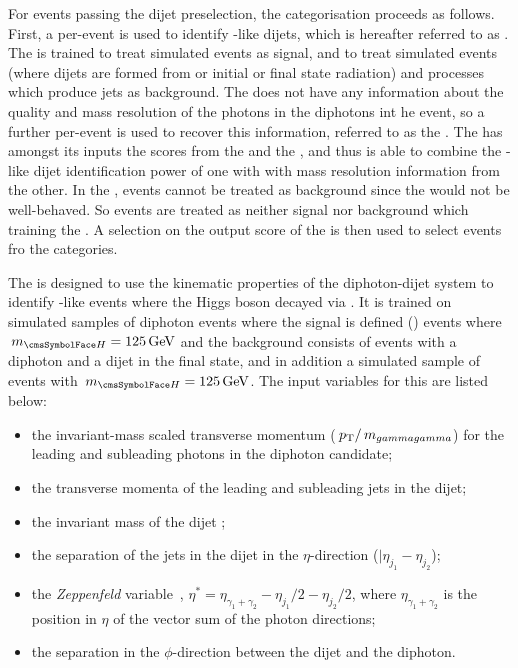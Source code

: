 For events passing the dijet preselection, the \VBFTag categorisation proceeds as follows. First, a per-event \BDT is used to identify \VBF-like dijets, which is hereafter referred to as \DiJetBdt. The \DiJetBdt is trained to treat simulated \VBF events as signal, and to treat simulated \ggH events (where dijets are formed from \PU or initial or final state radiation) and \SM processes which produce jets as background. The \DiJetBdt does not have any information about the quality and mass resolution of the photons in the diphotons int he event, so a further per-event \BDT is used to recover this information, referred to as the \DiPhoDiJetBdt. The \DiPhoDiJetBdt has amongst its inputs the scores from the \DiPhoBdt and the \DiJetBdt, and thus is able to combine the \VBF-like dijet identification power of one \BDT with with mass resolution information from the other. In the  \DiPhoDiJetBdt, \ggH events cannot be treated as background since the \DiPhoBdt would not be well-behaved. So \ggH events are treated as neither signal nor background which training the \DiPhoDiJetBdt. A selection on the output score of the \DiPhoDiJetBdt is then used to select events fro the \VBFTag categories.

The \DiJetBdt is designed to use the kinematic properties of the diphoton-dijet system to identify \VBF-like events where the Higgs boson decayed via \Hgg. It is trained on simulated samples of diphoton events where the signal is defined \VBF (\Hgg) events where $\mH=125\GeV$ and the background consists of \SM events with a diphoton and a dijet in the final state, and in addition a simulated sample of \ggH events with $\mH=125\GeV$. The input variables for this \BDT are listed below:
\begin{itemize}
\item the invariant-mass scaled transverse momentum ($\,p_\text{T}/\,m_{gammagamma}$) for the leading and subleading photons in the diphoton candidate;
\item the transverse momenta of the leading and subleading jets in the dijet;
\item the invariant mass of the dijet \mjj;
\item the separation of the jets in the dijet in the $\eta$-direction ($|\eta_{j_1} - \eta_{j_2}$);
\item the \emph{Zeppenfeld} variable~\cite{Zeppenfeld}, $\eta^{*} = \eta_{\gamma_1+\gamma_2} - \eta_{j_1}/2 - \eta_{j_2}/2$, where $\eta_{\gamma_1+\gamma_2}$ is the position in $\eta$ of the vector sum of the photon directions;
\item the separation in the $\phi$-direction between the dijet and the diphoton.
\end{itemize}

